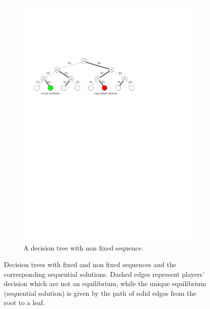 \documentclass[runningheads]{llncs}
\begin{document}
\begin{figure}
	\begin{subfigure}{.8\textwidth}
		\centering
		\includegraphics[scale=.8]{decision_tree_not_fixed}
		\caption{A decision tree with non fixed sequence.}
		\label{fig:decision_tree_not_fixed}
	\end{subfigure}%
	\caption{Decision trees with fixed and non fixed sequences and the corresponding sequential solutions. Dashed edges represent players' decision which are not an equilibrium, while the unique equilibrium (sequential solution) is given by the path of solid edges from the root to a leaf.}
	\label{fig:decision_trees}
\end{figure}
\end{document}

